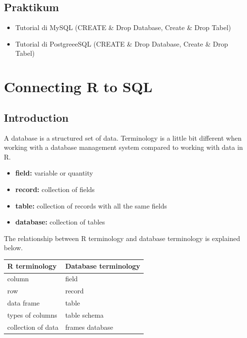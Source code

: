 \documentclass[
]{book}
\providecommand{\tightlist}{%
  \setlength{\itemsep}{0pt}\setlength{\parskip}{0pt}}
\begin{document}
\hypertarget{praktikum}{%
\section{Praktikum}\label{praktikum}}

\begin{itemize}
\tightlist
\item
  Tutorial di MySQL (CREATE \& Drop Database, Create \& Drop Tabel)
\item
  Tutorial di PostgreeeSQL (CREATE \& Drop Database, Create \& Drop Tabel)
\end{itemize}

\hypertarget{connecting-r-to-sql}{%
\chapter{Connecting R to SQL}\label{connecting-r-to-sql}}

\hypertarget{introduction}{%
\section{Introduction}\label{introduction}}

A database is a structured set of data. Terminology is a little bit different when working with a database management system compared to working with data in R.

\begin{itemize}
\tightlist
\item
  \textbf{field:} variable or quantity
\item
  \textbf{record:} collection of fields
\item
  \textbf{table:} collection of records with all the same fields
\item
  \textbf{database:} collection of tables
\end{itemize}

The relationship between R terminology and database terminology is explained below.

\begin{longtable}[]{@{}ll@{}}
\toprule\noalign{}
R terminology & Database terminology \\
\midrule\noalign{}
\endhead
\bottomrule\noalign{}
\endlastfoot
column & field \\
row & record \\
data frame & table \\
types of columns & table schema \\
collection of data & frames database \\
\end{longtable}
\end{document}
